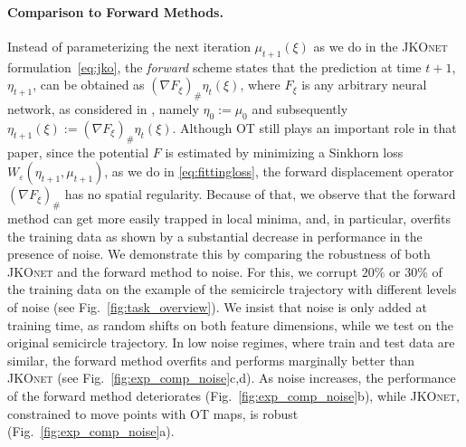 \paragraph{Comparison to Forward Methods.} \label{sec:eval_comp_fb}
Instead of parameterizing the next iteration $\mu_{t+1}(\xi)$ as we do in the \textsc{JKOnet} formulation~\eqref{eq:jko}, the \emph{forward} scheme states that the prediction at time $t+1$, $\eta_{t+1}$, can be obtained as $(\nabla F_\xi)_{\#} \eta_t(\xi)$, where $F_\xi$ is any arbitrary neural network, as considered in \citet{hashimoto2016learning}, namely $\eta_0:=\mu_0$ and subsequently $\eta_{t+1}(\xi):=(\nabla F_\xi)_{\#} \eta_t(\xi)$. Although OT still plays an important role in that paper, since the potential $F$ is estimated by minimizing a Sinkhorn loss $W_\varepsilon(\eta_{t+1},\mu_{t+1})$, as we do in \eqref{eq:fittingloss}, the forward displacement operator $(\nabla F_\xi)_{\#}$ has no spatial regularity. Because of that, we observe that the forward method can get more easily trapped in local minima, and, in particular, overfits the training data as shown by a substantial decrease in performance in the presence of noise.
We demonstrate this by comparing the robustness of both \textsc{JKOnet} and the forward method to noise. For this, we corrupt $20\%$ or $30\%$ of the training data on the example of the semicircle trajectory with different levels of noise (see Fig.~\ref{fig:task_overview}). We insist that noise is only added at training time, as random shifts on both feature dimensions, while we test on the original semicircle trajectory.
In low noise regimes, where train and test data are similar, the forward method overfits and performs marginally better than \textsc{JKOnet} (see Fig.~\ref{fig:exp_comp_noise}c,d). As noise increases, the performance of the forward method deteriorates (Fig.~\ref{fig:exp_comp_noise}b), while \textsc{JKOnet}, constrained to move points with OT maps, is robust (Fig.~\ref{fig:exp_comp_noise}a).%


